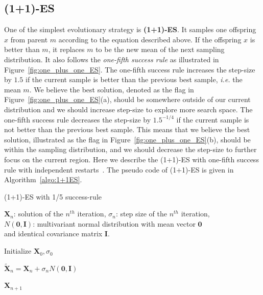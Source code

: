\subsection{(1+1)-ES}
One of the simplest evolutionary strategy is \textbf{(1+1)-ES}.
It samples one offspring $x$ from parent $m$ according to the equation described above.
If the offspring $x$ is better than $m$, it replaces $m$ to be the new mean of the next sampling distribution.
It also follows the \textit{one-fifth success rule} as illustrated in Figure~\ref{fig:one_plus_one_ES}.
The one-fifth success rule increases the step-size by $1.5$ if the current sample is better than the previous best sample, \textit{i.e.} the mean $m$.
We believe the best solution, denoted as the flag in Figure~\ref{fig:one_plus_one_ES}(a), 
should be somewhere outside of our current distribution and we should increase step-size to explore more search space.
The one-fifth success rule decreases the step-size by $1.5^{-1/4}$ if the current sample is not better than the previous best sample.
This means that we believe the best solution, illustrated as the flag in Figure~\ref{fig:one_plus_one_ES}(b),
should be within the sampling distribution, and we should decrease the step-size to further focus on the current region.
Here we describe the (1+1)-ES with one-fifth success rule with independent restarts~\cite{Auger:2009:one_plus_one_ES}.
The pseudo code of (1+1)-ES is given in Algorithm~\ref{algo:1+1ES}.

\begin{algorithm}%
\caption{(1+1)-ES with 1/5 success-rule}\label{algo:1+1ES}

$\boldsymbol{X}_{n}$: solution of the $n^{th}$ iteration, $\sigma_n$: step size of the $n^{th}$ iteration, \\
$N(\boldsymbol{0}, \boldsymbol{I})$: multivariant normal distribution with mean vector $\boldsymbol{0}$ \\ 
and identical covariance matrix $\boldsymbol{I}$.

\BlankLine
{} 

\BlankLine
Initialize $\boldsymbol{X}_0, \sigma_0$ \\
 {

    $\widetilde{\boldsymbol{X}}_n = \boldsymbol{X}_n + \sigma_n N(\boldsymbol{0}, \boldsymbol{I})$  \\

}

\Return $\boldsymbol{X}_{n+1}$

\end{algorithm}



